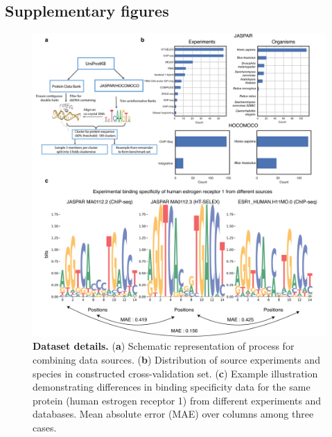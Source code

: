 \subsection*{Supplementary figures}
\label{supp}

\renewcommand{\thefigure}{S\arabic{figure}}
\setcounter{figure}{0}
\begin{center}
\begin{figure}[H]
  \includegraphics[width=\linewidth]{./pdnafigs/figS1.png}
    \caption[Dataset details.]{\textbf{Dataset details.} ({\bf a}) Schematic representation of process for combining data sources. ({\bf b}) Distribution of source experiments and species in constructed cross-validation set. ({\bf c}) Example illustration demonstrating differences in binding specificity data for the same protein (human estrogen receptor 1) from different experiments and databases. Mean absolute error (MAE) over columns among three cases.}
  \label{fig:pdnaS1}
\end{figure}
\end{center}

